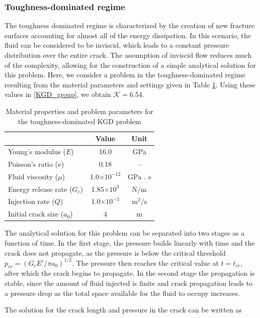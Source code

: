 \subsubsection{Toughness-dominated regime}
The toughness dominated regime is characterized by the creation of new fracture surfaces accounting for almost all of the energy dissipation.  
In this scenario, the fluid can be considered to be inviscid, which leads to a constant pressure distribution over the entire crack.  The assumption of inviscid flow reduces much of the complexity, allowing for the construction of a simple analytical solution for this problem. 
Here, we consider a problem in the toughness-dominated regime resulting from the material parameters and settings given in Table \ref{parameters_tKGD}.  Using these values in \eqref{KGD_group}, we obtain $\mathcal{K} = 6.54$. 

\begin{table}[ht]
\centering
\caption{Material properties and problem parameters for the toughness-dominated KGD problem}
\begin{tabular}[t]{lcc}
\hline
&Value &Unit \\
\hline
Young's modulus ($E$)&16.0&GPa\\
Poisson's ratio ($\nu$)&0.18&--\\
Fluid viscosity ($\mu$)&1.0$\times10^{-12}$&$\text{GPa . s}$\\
Energy release rate ($G_c$)&1.85$\times10^{3}$&$\text{N/m}$\\
Injection rate ($Q$)&1.0$\times10^{-3}$&$\text{m}^2/\text{s}$\\
Initial crack size ($a_0$) &4&$\text{m}$\\
\hline
\end{tabular}
\label{parameters_tKGD}
\end{table}%

The analytical solution for this problem can be separated into two stages as a function of time. 
In the first stage, the pressure builds linearly with time and the crack does not propagate, as the pressure is below the critical threshold $p_{cr} =(G_cE'/\pi a_0)^{1/2}$.  The pressure then reaches the critical value at $t=t_{cr}$, after which the crack begins to propagate. In the second stage the propagation is stable, since the amount of fluid injected is finite and crack propagation leads to a pressure drop as the total space available for the fluid to occupy increases.

The solution for the crack length and pressure in the crack can be written as

